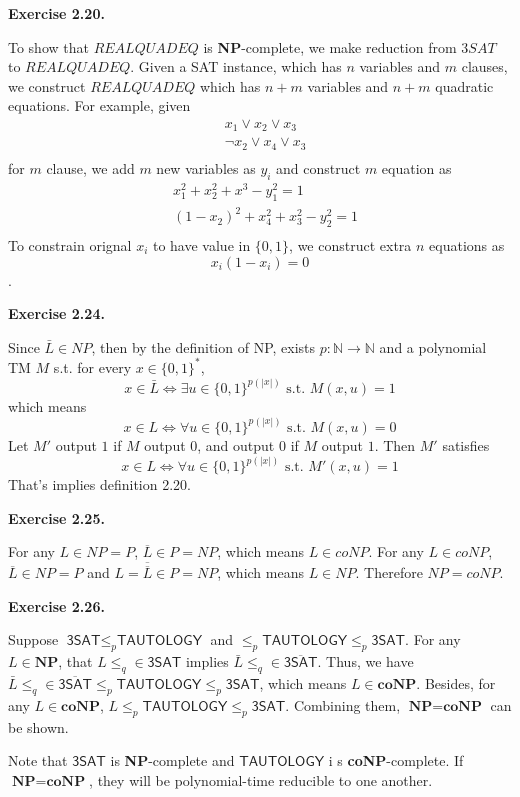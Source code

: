 \documentclass[a4paper]{article}
\newenvironment{exercise}[1]{
	\par
	\noindent\textbf{Exercise #1.}\quad
}{
	\par
	\bigskip
}
\begin{document}
	\begin{exercise}{2.20}
		To show that $REALQUADEQ$ is \textbf{NP}-complete, we make reduction from $3SAT$ to $REALQUADEQ$.
		Given a SAT instance, which has $n$ variables and $m$ clauses, we construct $REALQUADEQ$ which has $n+m$ variables and $n+m$ quadratic equations. For example, given
		\begin{align*}
			& x_1\vee x_2\vee x_3\\
			&\neg x_2\vee x_4\vee x_3\\
		\end{align*}
		for $m$ clause, we add $m$ new variables as $y_i$ and construct $m$ equation as 
		\begin{align*}
			&x_1^2+x_2^2+x^3-y_1^2=1\\
			&(1-x_2)^2+x_4^2+x_3^2-y_2^2=1\\
		\end{align*}
		To constrain orignal $x_i$ to have value in $\{0,1\}$, we construct extra $n$ equations as 
		$$x_i(1-x_i)=0$$.
	\end{exercise}
        
	\begin{exercise}{2.24}
	Since $\bar{L} \in NP$, then by the definition of NP, exists $p: \mathbb{N}\rightarrow \mathbb{N}$ and a polynomial TM $M$ s.t. for every $x \in \{0,1\}^{*}$,
$$x \in \bar{L} \Leftrightarrow \exists u \in \{0,1\}^{p(|x|)} \text{ s.t. } M(x,u) = 1$$
which means
$$x \in L \Leftrightarrow \forall u \in \{0,1\}^{p(|x|)} \text{ s.t. } M(x,u) = 0$$
Let $M'$ output $1$ if $M$ output $0$, and output $0$ if $M$ output $1$.
Then $M'$ satisfies
$$x \in L \Leftrightarrow \forall u \in \{0,1\}^{p(|x|)} \text{ s.t. } M'(x,u) = 1$$
That's implies definition 2.20.
\end{exercise}

    \begin{exercise}{2.25}
        For any $L\in NP=P$, $\overline{L}\in P=NP$, which means $L\in coNP$.
        For any $L\in coNP$, $\overline{L}\in NP=P$ and $L=\overline{\overline{L}}\in P=NP$, which means $L\in NP$.
        Therefore $NP=coNP$.
    \end{exercise}
	
	\begin{exercise}{2.26}
		Suppose $\textsf{3SAT} \leq_p \textsf{TAUTOLOGY}$ and $ \leq_p \textsf{TAUTOLOGY} \leq_p \textsf{3SAT}$. For any $L \in \textbf{NP}$, that $L \leq_q \in \textsf{3SAT}$ implies $\bar L \leq_q \in \overline{\textsf{3SAT}}$. Thus, we have $\bar L \leq_q \in \overline{\textsf{3SAT}} \leq_p \textsf{TAUTOLOGY} \leq_p \textsf{3SAT}$, which means $L \in \textbf{coNP}$. Besides, for any $L \in \textbf{coNP}$, $L \leq_p \textsf{TAUTOLOGY} \leq_p \textsf{3SAT}$. Combining them, $\textbf{NP} = \textbf{coNP}$ can be shown.

		Note that $\textsf{3SAT}$ is \textbf{NP}-complete and $\textsf{TAUTOLOGY}$ i s \textbf{coNP}-complete. If $\textbf{NP} = \textbf{coNP}$, they will be polynomial-time reducible to one another.
	\end{exercise}
\end{document}
